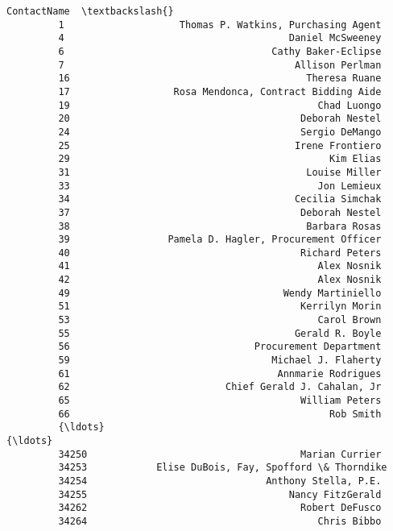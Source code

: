 \documentclass[11pt]{article}
\begin{document}
\begin{Verbatim}[commandchars=\\\{\}]
                                                      ContactName  \textbackslash{}
         1                    Thomas P. Watkins, Purchasing Agent   
         4                                       Daniel McSweeney   
         6                                    Cathy Baker-Eclipse   
         7                                        Allison Perlman   
         16                                         Theresa Ruane   
         17                  Rosa Mendonca, Contract Bidding Aide   
         19                                           Chad Luongo   
         20                                        Deborah Nestel   
         24                                        Sergio DeMango   
         25                                       Irene Frontiero   
         29                                             Kim Elias   
         31                                         Louise Miller   
         33                                           Jon Lemieux   
         34                                       Cecilia Simchak   
         37                                        Deborah Nestel   
         38                                         Barbara Rosas   
         39                 Pamela D. Hagler, Procurement Officer   
         40                                        Richard Peters   
         41                                           Alex Nosnik   
         42                                           Alex Nosnik   
         49                                     Wendy Martiniello   
         51                                        Kerrilyn Morin   
         53                                           Carol Brown   
         55                                       Gerald R. Boyle   
         56                                Procurement Department   
         59                                   Michael J. Flaherty   
         61                                    Annmarie Rodrigues   
         62                           Chief Gerald J. Cahalan, Jr   
         65                                        William Peters   
         66                                             Rob Smith   
         {\ldots}                                                  {\ldots}   
         34250                                     Marian Currier   
         34253            Elise DuBois, Fay, Spofford \& Thorndike   
         34254                               Anthony Stella, P.E.   
         34255                                   Nancy FitzGerald   
         34262                                     Robert DeFusco   
         34264                                        Chris Bibbo   

\end{Verbatim}
\end{document}
